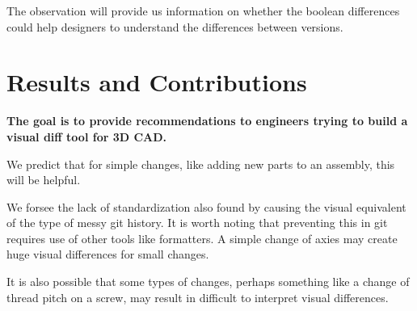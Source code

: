 \documentclass[sigconf,]{acmart}
\begin{document}
The observation will provide us information on whether the boolean differences could help designers to understand the differences between versions.


\section{Results and Contributions}

\textbf{The goal is to provide recommendations to engineers trying to build a visual diff tool for 3D CAD.}

We predict that for simple changes, like adding new parts to an assembly, this will be helpful.

We forsee the lack of standardization also found by \citet{cheng2023age} causing the visual equivalent of the type of messy git history.
It is worth noting that preventing this in git requires use of other tools like formatters.
A simple change of axies may create huge visual differences for small changes.

It is also possible that some types of changes, perhaps something like a change of thread pitch on a screw, may result in difficult to interpret visual differences.





\end{document}
